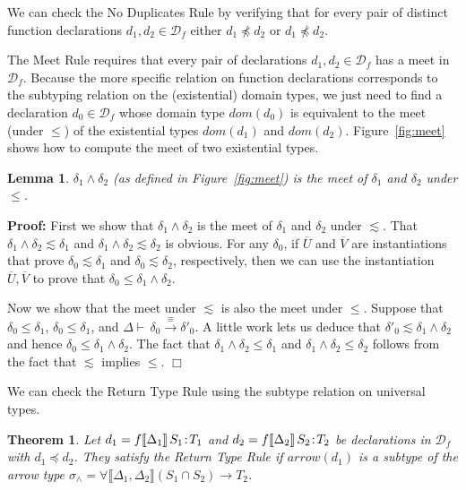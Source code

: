 \documentclass[10pt]{sigplanconf}
\newcommand{\ms}{\preceq}
\renewcommand{\bar}{\overline}
\newcommand{\meet}{\wedge}
\newcommand{\leinner}{\ensuremath{\lesssim}}
\newcommand{\dom}{\ensuremath{\mathit{dom}}}
\newcommand{\arrow}{\ensuremath{\mathit{arrow}}}
\newcommand{\ob}[1]{\ensuremath{\llbracket {#1} \rrbracket}}
\newcommand{\hdeclg}[4]{\mbox{\ensuremath{#1 \ob{#2}\, #3\!:\!#4}}}
\newcommand{\D}{\ensuremath{\mathcal{D}}}
\newcommand{\Df}[1][f]{\D_{\!#1}}
\newcommand{\eqred}{\overset{\equiv}{\longrightarrow}}
\newcommand{\jtred}[2]{\ensuremath{\Delta \vdash\,{#1} \eqred {#2}}}
\newtheorem{lemma}{Lemma}
\newtheorem{theorem}{Theorem}
\newenvironment{proof}{\noindent \textbf{Proof:} }{\hfill $\Box$}
\begin{document}
We can check the No Duplicates Rule by verifying that for every pair of distinct function
declarations $d_1, d_2 \in \Df$ either $d_1 \not \ms d_2$ or $d_1 \not \ms d_2$. 

The Meet Rule requires that every pair of declarations $d_1, d_2 \in \Df$ 
has a meet in $\Df$. 
Because the more specific relation on function declarations 
corresponds to the subtyping relation on the (existential) domain types,
we just need to find a declaration $d_0 \in \Df$ 
whose domain type $dom(d_0)$ 
is equivalent to the meet (under $\le$) 
of the existential types $\dom(d_1)$ and $\dom(d_2)$.
Figure~\ref{fig:meet} shows how to compute the meet of two existential types.

\begin{lemma}\label{lem:meet}
$\delta_1 \meet \delta_2$ (as defined in Figure~\ref{fig:meet}) 
is the meet of $\delta_1$ and $\delta_2$ under $\le$.
\end{lemma}
\begin{proof}
First we show that $\delta_1 \meet \delta_2$ is the meet of $\delta_1$ and $\delta_2$ under $\leinner$. That $\delta_1 \meet \delta_2 \leinner \delta_1$ and $\delta_1 \meet \delta_2 \leinner \delta_2$ is obvious.
For any $\delta_0$, if $\bar{U}$ and $\bar{V}$ are instantiations that prove
$\delta_0 \leinner \delta_1$ and $\delta_0 \leinner \delta_2$, respectively,
then we can use the instantiation $\bar{U},\bar{V}$ to prove that $\delta_0 \le \delta_1 \meet \delta_2$.

Now we show that the meet under $\leinner$ is also the meet under $\le$. Suppose that $\delta_0 \le \delta_1$, $\delta_0 \le \delta_1$,
and $\jtred{\delta_0}{\delta'_0}$. A little work lets us deduce that $\delta'_0 \leinner \delta_1 \meet \delta_2$ and hence $\delta_0 \le \delta_1 \meet \delta_2$.
The fact that $\delta_1 \meet \delta_2 \le \delta_1$ and $\delta_1 \meet \delta_2 \le \delta_2$ follows from the fact that $\leinner$ implies $\le$.
\end{proof}

We can check the Return Type Rule using the subtype relation on universal types.
\begin{theorem}
Let $d_1 = \hdeclg{f}{\Delta_1}{S_1}{T_1}$ and $d_2 = \hdeclg{f}{\Delta_2}{S_2}{T_2}$ be declarations
in $\Df$ with $d_1 \ms d_2$. 
They satisfy the Return Type Rule if $\arrow(d_1)$ is a subtype of
the arrow type $\sigma_{\wedge} = \forall\ob{\Delta_1, \Delta_2}(S_1 \cap S_2) \rightarrow T_2$.
\end{theorem}
\end{document}
